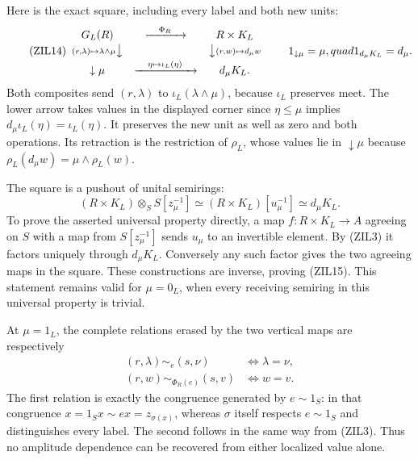 Here is the exact square, including every label and both new units:
\begin{equation}\tag{ZIL14}
\begin{array}{ccc}
G_L(R)&\xrightarrow{\quad\Phi_R\quad}&R\times K_L\\[2pt]
{\scriptstyle(r,\lambda)\mapsto\lambda\wedge\mu}\big\downarrow
&&\big\downarrow{\scriptstyle(r,w)\mapsto d_\mu w}\\[2pt]
\downarrow\mu&\xrightarrow{\quad\eta\mapsto\iota_L(\eta)\quad}
   &d_\mu K_L .
\end{array}
\qquad
1_{\downarrow\mu}=\mu,quad1_{d_\mu K_L}=d_\mu.
\end{equation}
Both composites send $(r,\lambda)$ to
$\iota_L(\lambda\wedge\mu)$, because $\iota_L$ preserves meet.
The lower arrow takes values in the displayed corner since
$\eta\le\mu$ implies $d_\mu\iota_L(\eta)=\iota_L(\eta)$.
It preserves the new unit as well as zero and both operations.
Its retraction is the restriction of $\rho_L$, whose values lie in
$\downarrow\mu$ because
$\rho_L(d_\mu w)=\mu\wedge\rho_L(w)$.

The square is a pushout of unital semirings:
\begin{equation}\tag{ZIL15}
 (R\times K_L)\otimes_S S[z_\mu^{-1}]
       \simeq (R\times K_L)[u_\mu^{-1}]
       \simeq d_\mu K_L.
\end{equation}
To prove the asserted universal property directly, a map
$f:R\times K_L\to A$ agreeing on $S$ with a map from
$S[z_\mu^{-1}]$ sends $u_\mu$ to an invertible element.
By (ZIL3) it factors uniquely through $d_\mu K_L$.
Conversely any such factor gives the two agreeing maps in the
square. These constructions are inverse, proving (ZIL15).
This statement remains valid for $\mu=0_L$, when every receiving
semiring in this universal property is trivial.

At $\mu=1_L$, the complete relations erased by the two vertical
maps are respectively
\begin{equation}\tag{ZIL16}
 \begin{split}
 (r,\lambda)\sim_e(s,\nu)&\Longleftrightarrow\lambda=\nu,\\
 (r,w)\sim_{\Phi_R(e)}(s,v)&\Longleftrightarrow w=v.
 \end{split}
\end{equation}
The first relation is exactly the congruence generated by
$e\sim1_S$: in that congruence
$x=1_Sx\sim ex=z_{\sigma(x)}$, whereas $\sigma$ itself respects
$e\sim1_S$ and distinguishes every label. The second follows
in the same way from (ZIL3). Thus no amplitude dependence can
be recovered from either localized value alone.

